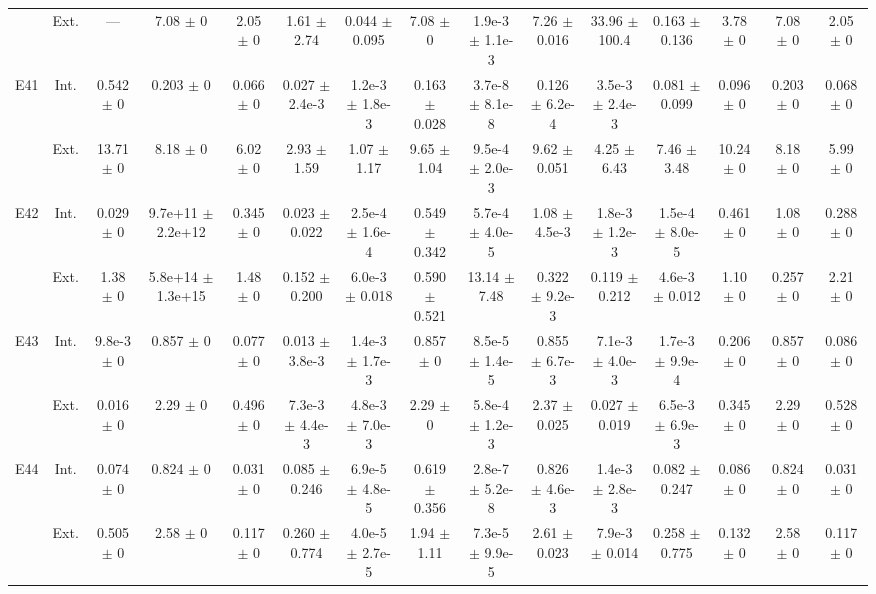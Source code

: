 \begin{table}[htbp]
{\begin{tabular}{@{}ccccccccccccccc@{}}
 & Ext. & --- & 7.08 $\pm$ 0 & 2.05 $\pm$ 0 & 1.61 $\pm$ 2.74 & 0.044 $\pm$ 0.095 & 7.08 $\pm$ 0 & 1.9e-3 $\pm$ 1.1e-3 & 7.26 $\pm$ 0.016 & 33.96 $\pm$ 100.4 & 0.163 $\pm$ 0.136 & 3.78 $\pm$ 0 & 7.08 $\pm$ 0 & 2.05 $\pm$ 0 \\
\cline{2-15}
\multirow{2}{*}{E41} & Int. & 0.542 $\pm$ 0 & 0.203 $\pm$ 0 & 0.066 $\pm$ 0 & 0.027 $\pm$ 2.4e-3 & 1.2e-3 $\pm$ 1.8e-3 & 0.163 $\pm$ 0.028 & 3.7e-8 $\pm$ 8.1e-8 & 0.126 $\pm$ 6.2e-4 & 3.5e-3 $\pm$ 2.4e-3 & 0.081 $\pm$ 0.099 & 0.096 $\pm$ 0 & 0.203 $\pm$ 0 & 0.068 $\pm$ 0 \\
 & Ext. & 13.71 $\pm$ 0 & 8.18 $\pm$ 0 & 6.02 $\pm$ 0 & 2.93 $\pm$ 1.59 & 1.07 $\pm$ 1.17 & 9.65 $\pm$ 1.04 & 9.5e-4 $\pm$ 2.0e-3 & 9.62 $\pm$ 0.051 & 4.25 $\pm$ 6.43 & 7.46 $\pm$ 3.48 & 10.24 $\pm$ 0 & 8.18 $\pm$ 0 & 5.99 $\pm$ 0 \\
\cline{2-15}
\multirow{2}{*}{E42} & Int. & 0.029 $\pm$ 0 & 9.7e+11 $\pm$ 2.2e+12 & 0.345 $\pm$ 0 & 0.023 $\pm$ 0.022 & 2.5e-4 $\pm$ 1.6e-4 & 0.549 $\pm$ 0.342 & 5.7e-4 $\pm$ 4.0e-5 & 1.08 $\pm$ 4.5e-3 & 1.8e-3 $\pm$ 1.2e-3 & 1.5e-4 $\pm$ 8.0e-5 & 0.461 $\pm$ 0 & 1.08 $\pm$ 0 & 0.288 $\pm$ 0 \\
 & Ext. & 1.38 $\pm$ 0 & 5.8e+14 $\pm$ 1.3e+15 & 1.48 $\pm$ 0 & 0.152 $\pm$ 0.200 & 6.0e-3 $\pm$ 0.018 & 0.590 $\pm$ 0.521 & 13.14 $\pm$ 7.48 & 0.322 $\pm$ 9.2e-3 & 0.119 $\pm$ 0.212 & 4.6e-3 $\pm$ 0.012 & 1.10 $\pm$ 0 & 0.257 $\pm$ 0 & 2.21 $\pm$ 0 \\
\cline{2-15}
\multirow{2}{*}{E43} & Int. & 9.8e-3 $\pm$ 0 & 0.857 $\pm$ 0 & 0.077 $\pm$ 0 & 0.013 $\pm$ 3.8e-3 & 1.4e-3 $\pm$ 1.7e-3 & 0.857 $\pm$ 0 & 8.5e-5 $\pm$ 1.4e-5 & 0.855 $\pm$ 6.7e-3 & 7.1e-3 $\pm$ 4.0e-3 & 1.7e-3 $\pm$ 9.9e-4 & 0.206 $\pm$ 0 & 0.857 $\pm$ 0 & 0.086 $\pm$ 0 \\
 & Ext. & 0.016 $\pm$ 0 & 2.29 $\pm$ 0 & 0.496 $\pm$ 0 & 7.3e-3 $\pm$ 4.4e-3 & 4.8e-3 $\pm$ 7.0e-3 & 2.29 $\pm$ 0 & 5.8e-4 $\pm$ 1.2e-3 & 2.37 $\pm$ 0.025 & 0.027 $\pm$ 0.019 & 6.5e-3 $\pm$ 6.9e-3 & 0.345 $\pm$ 0 & 2.29 $\pm$ 0 & 0.528 $\pm$ 0 \\
\cline{2-15}
\multirow{2}{*}{E44} & Int. & 0.074 $\pm$ 0 & 0.824 $\pm$ 0 & 0.031 $\pm$ 0 & 0.085 $\pm$ 0.246 & 6.9e-5 $\pm$ 4.8e-5 & 0.619 $\pm$ 0.356 & 2.8e-7 $\pm$ 5.2e-8 & 0.826 $\pm$ 4.6e-3 & 1.4e-3 $\pm$ 2.8e-3 & 0.082 $\pm$ 0.247 & 0.086 $\pm$ 0 & 0.824 $\pm$ 0 & 0.031 $\pm$ 0 \\
 & Ext. & 0.505 $\pm$ 0 & 2.58 $\pm$ 0 & 0.117 $\pm$ 0 & 0.260 $\pm$ 0.774 & 4.0e-5 $\pm$ 2.7e-5 & 1.94 $\pm$ 1.11 & 7.3e-5 $\pm$ 9.9e-5 & 2.61 $\pm$ 0.023 & 7.9e-3 $\pm$ 0.014 & 0.258 $\pm$ 0.775 & 0.132 $\pm$ 0 & 2.58 $\pm$ 0 & 0.117 $\pm$ 0 \\

\end{tabular}}
\end{table}
